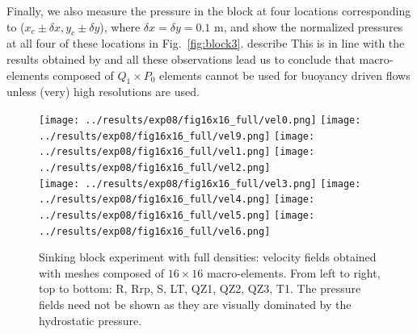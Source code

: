 \documentclass[a4paper,12pt]{article}
\begin{document}
Finally, we also measure the pressure in the block 
at four locations corresponding to ($x_c \pm \delta x, y_c \pm \delta y$),
where $\delta x = \delta y = 0.1$ m, and show the normalized pressures
at all four of these locations in Fig.~\ref{fig:block3}.
{\color{red} describe}
This is in line with the results obtained by \cite{thba22} and 
all these observations lead us to conclude that 
macro-elements composed of $Q_1 \times P_0$ elements cannot be used for buoyancy 
driven flows unless (very) high resolutions are used.

\begin{figure}[t]
\centering
\texttt{[image: ../results/exp08/fig16x16\_full/vel0.png]} %
\texttt{[image: ../results/exp08/fig16x16\_full/vel9.png]} %
\texttt{[image: ../results/exp08/fig16x16\_full/vel1.png]} %
\texttt{[image: ../results/exp08/fig16x16\_full/vel2.png]}\\ %
\texttt{[image: ../results/exp08/fig16x16\_full/vel3.png]} %
\texttt{[image: ../results/exp08/fig16x16\_full/vel4.png]} %
\texttt{[image: ../results/exp08/fig16x16\_full/vel5.png]} %
\texttt{[image: ../results/exp08/fig16x16\_full/vel6.png]} %
\caption{Sinking block experiment with full densities: velocity fields 
obtained with meshes composed of $16\times 16$ macro-elements.
From left to right, top to bottom: R, Rrp, S, LT, QZ1, QZ2, QZ3, T1.
The pressure fields need not be shown as they are visually dominated 
by the hydrostatic pressure.
\label{fig:block1}}
\end{figure}
\end{document}
